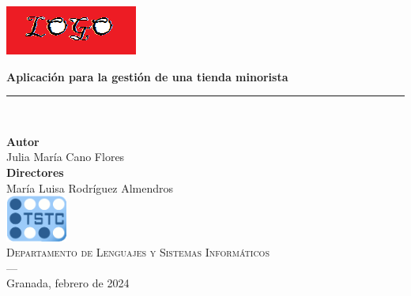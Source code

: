 \begin{titlepage}
 
 
\setlength{\centeroffset}{-0.5\oddsidemargin}
\addtolength{\centeroffset}{0.5\evensidemargin}
\thispagestyle{empty}

\noindent\hspace*{\centeroffset}\begin{minipage}{\textwidth}

\centering

% 

 \vspace{3.3cm}

\includegraphics{imagenes/logo.png} 
 \vspace{0.5cm}


{\Huge\bfseries Aplicación para la gestión de una tienda minorista\\
}
\noindent\rule[-1ex]{\textwidth}{3pt}\\[3.5ex]

\end{minipage}

\vspace{2.5cm}
\noindent\hspace*{\centeroffset}\begin{minipage}{\textwidth}
\centering

\textbf{Autor}\\ {Julia María Cano Flores}\\[2.5ex]
\textbf{Directores}\\
{María Luisa Rodríguez Almendros}\\[2cm]
\includegraphics[width=0.15\textwidth]{imagenes/tstc.png}\\[0.1cm]
\textsc{Departamento de Lenguajes y Sistemas Informáticos}\\
\textsc{---}\\
Granada, febrero de 2024
\end{minipage}
\addtolength{\textwidth}{\centeroffset}

 
\end{titlepage}


